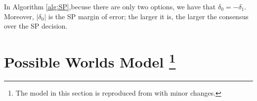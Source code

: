 \documentclass{report}
\theoremstyle{definition}
\begin{document}
In Algorithm \ref{alg:SP},becuse there are only two options, we have that $\delta_0 = -\delta_1$. Moreover, $|\delta_0|$ is the SP margin of error; the larger it is, the larger the consensus over the SP decision.






\section[Possible Worlds Model]{Possible Worlds Model \protect\footnote{The model in this section is reproduced from \cite{mccoy:stat} with minor changes.}}
\label{sec:PWM}
\end{document}
